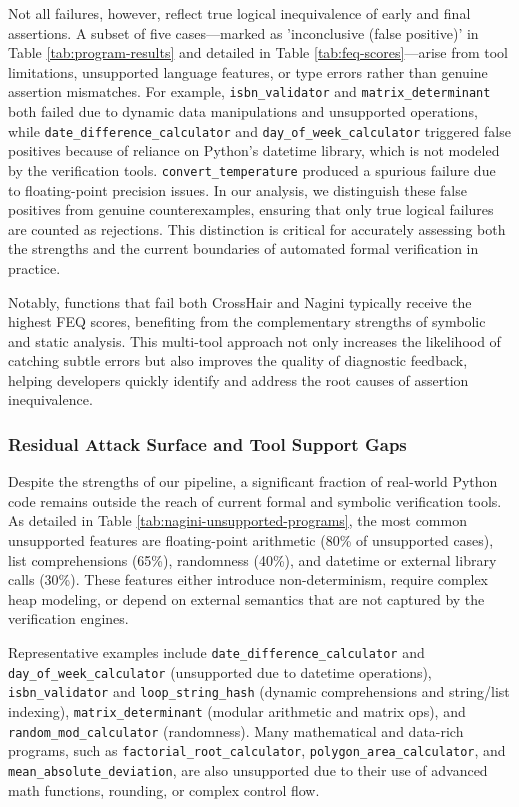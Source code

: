 Not all failures, however, reflect true logical inequivalence of early and final assertions. A subset of five cases---marked as 'inconclusive (false positive)' in Table \ref{tab:program-results} and detailed in Table \ref{tab:feq-scores}---arise from tool limitations, unsupported language features, or type errors rather than genuine assertion mismatches. For example, \texttt{isbn\_validator} and \texttt{matrix\_determinant} both failed due to dynamic data manipulations and unsupported operations, while \texttt{date\_difference\_calculator} and \texttt{day\_of\_week\_calculator} triggered false positives because of reliance on Python's datetime library, which is not modeled by the verification tools. \texttt{convert\_temperature} produced a spurious failure due to floating-point precision issues. In our analysis, we distinguish these false positives from genuine counterexamples, ensuring that only true logical failures are counted as rejections. This distinction is critical for accurately assessing both the strengths and the current boundaries of automated formal verification in practice.

Notably, functions that fail both CrossHair and Nagini typically receive the highest FEQ scores, benefiting from the complementary strengths of symbolic and static analysis. This multi-tool approach not only increases the likelihood of catching subtle errors but also improves the quality of diagnostic feedback, helping developers quickly identify and address the root causes of assertion inequivalence.

\subsubsection{Residual Attack Surface and Tool Support Gaps} 

Despite the strengths of our pipeline, a significant fraction of real-world Python code remains outside the reach of current formal and symbolic verification tools. As detailed in Table \ref{tab:nagini-unsupported-programs}, the most common unsupported features are floating-point arithmetic (80\% of unsupported cases), list comprehensions (65\%), randomness (40\%), and datetime or external library calls (30\%). These features either introduce non-determinism, require complex heap modeling, or depend on external semantics that are not captured by the verification engines.

Representative examples include \texttt{date\_difference\_calculator} and \texttt{day\_of\_week\_calculator} (unsupported due to datetime operations), \texttt{isbn\_validator} and \texttt{loop\_string\_hash} (dynamic comprehensions and string/list indexing), \texttt{matrix\_determinant} (modular arithmetic and matrix ops), and \texttt{random\_mod\_calculator} (randomness). Many mathematical and data-rich programs, such as \texttt{factorial\_root\_calculator}, \texttt{polygon\_area\_calculator}, and \texttt{mean\_absolute\_deviation}, are also unsupported due to their use of advanced math functions, rounding, or complex control flow.

